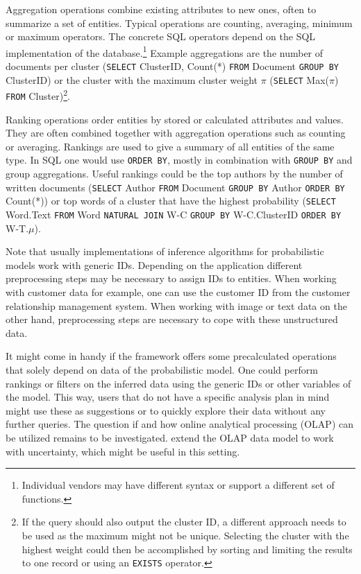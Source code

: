 Aggregation operations combine existing attributes to new ones, often to summarize a set of entities. Typical operations are counting, averaging, minimum or maximum operators. The concrete SQL operators depend on the SQL implementation of the database.\footnote{Individual vendors may have different syntax or support a different set of functions.} Example aggregations are the number of documents per cluster (\texttt{SELECT} ClusterID, Count(*) \texttt{FROM} Document \texttt{GROUP BY} ClusterID) or the cluster with the maximum cluster weight $\pi$ (\texttt{SELECT} Max($\pi$) \texttt{FROM} Cluster)\footnote{If the query should also output the cluster ID, a different approach needs to be used as the maximum might not be unique. Selecting the cluster with the highest weight could then be accomplished by sorting and limiting the results to one record or using an \texttt{EXISTS} operator.}.

Ranking operations order entities by stored or calculated attributes and values. They are often combined together with aggregation operations such as counting or averaging. Rankings are used to give a summary of all entities of the same type. In SQL one would use \texttt{ORDER BY}, mostly in combination with \texttt{GROUP BY} and group aggregations. Useful rankings could be the top authors by the number of written documents (\texttt{SELECT} Author \texttt{FROM} Document \texttt{GROUP BY} Author \texttt{ORDER BY} Count(*)) or top words of a cluster that have the highest probability (\texttt{SELECT} Word.Text \texttt{FROM} Word \texttt{NATURAL JOIN} W-C \texttt{GROUP BY} W-C.ClusterID \texttt{ORDER BY} W-T.$\mu$).

Note that usually implementations of inference algorithms for probabilistic models work with generic IDs. Depending on the application different preprocessing steps may be necessary to assign IDs to entities. When working with customer data for example, one can use the customer ID from the customer relationship management system. When working with image or text data on the other hand, preprocessing steps are necessary to cope with these unstructured data.

It might come in handy if the framework offers some precalculated operations that solely depend on data of the probabilistic model. One could perform rankings or filters on the inferred data using the generic IDs or other variables of the model. This way, users that do not have a specific analysis plan in mind might use these as suggestions or to quickly explore their data without any further queries. The question if and how online analytical processing (OLAP) can be utilized remains to be investigated. \textcite{burdick2007olap} extend the OLAP data model to work with uncertainty, which might be useful in this setting.
